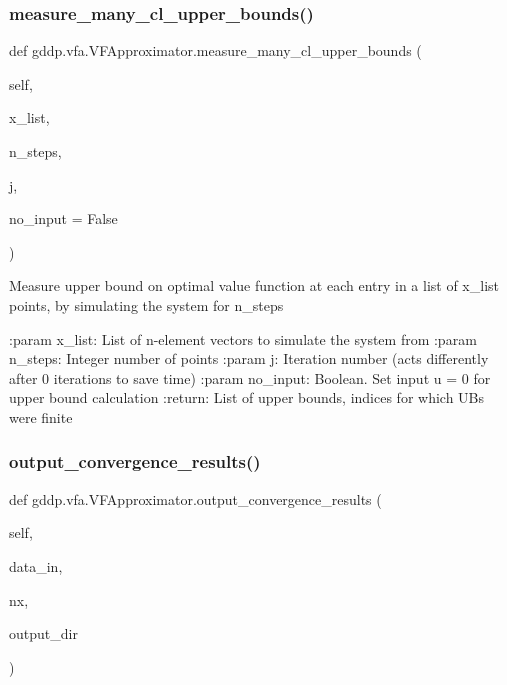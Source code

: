 \subsubsection{\texorpdfstring{measure\_many\_cl\_upper\_bounds()}{measure\_many\_cl\_upper\_bounds()}}
{\footnotesize\ttfamily def gddp.\+vfa.\+V\+F\+Approximator.\+measure\+\_\+many\+\_\+cl\+\_\+upper\+\_\+bounds (\begin{DoxyParamCaption}\item[{}]{self,  }\item[{}]{x\+\_\+list,  }\item[{}]{n\+\_\+steps,  }\item[{}]{j,  }\item[{}]{no\+\_\+input = {\ttfamily False} }\end{DoxyParamCaption})}

\begin{DoxyVerb}Measure upper bound on optimal value function at each entry in a list of x_list points,
by simulating the system for n_steps

:param x_list: List of n-element vectors to simulate the system from
:param n_steps: Integer number of points
:param j: Iteration number (acts differently after 0 iterations to save time)
:param no_input: Boolean. Set input u = 0 for upper bound calculation
:return: List of upper bounds, indices for which UBs were finite
\end{DoxyVerb}
 \mbox{\label{classgddp_1_1vfa_1_1_v_f_approximator_a088e2efabc1d0b07a228a5cb1ce2dfe9}} 
\subsubsection{\texorpdfstring{output\_convergence\_results()}{output\_convergence\_results()}}
{\footnotesize\ttfamily def gddp.\+vfa.\+V\+F\+Approximator.\+output\+\_\+convergence\+\_\+results (\begin{DoxyParamCaption}\item[{}]{self,  }\item[{}]{data\+\_\+in,  }\item[{}]{nx,  }\item[{}]{output\+\_\+dir }\end{DoxyParamCaption})}

